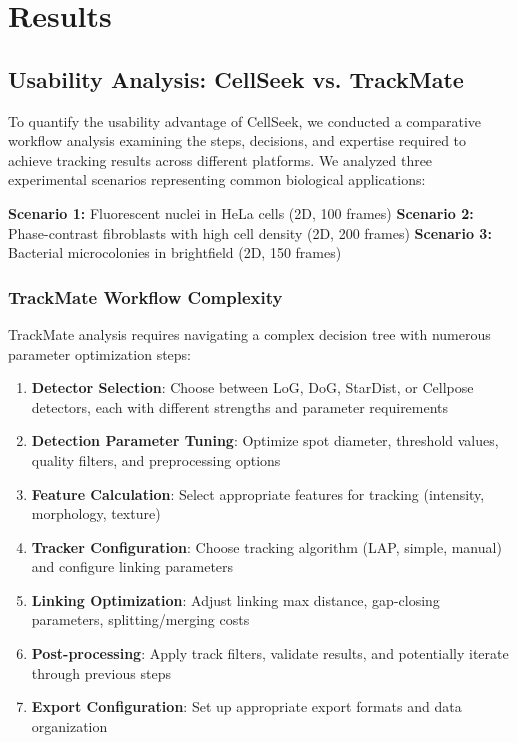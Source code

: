 \documentclass[../cellseek_paper.tex]{subfiles}
\begin{document}
\section{Results}

\subsection{Usability Analysis: CellSeek vs. TrackMate}

To quantify the usability advantage of CellSeek, we conducted a comparative workflow analysis examining the steps, decisions, and expertise required to achieve tracking results across different platforms. We analyzed three experimental scenarios representing common biological applications:

\textbf{Scenario 1:} Fluorescent nuclei in HeLa cells (2D, 100 frames)
\textbf{Scenario 2:} Phase-contrast fibroblasts with high cell density (2D, 200 frames)
\textbf{Scenario 3:} Bacterial microcolonies in brightfield (2D, 150 frames)

\subsubsection{TrackMate Workflow Complexity}

TrackMate analysis requires navigating a complex decision tree with numerous parameter optimization steps:

\begin{enumerate}
  \item \textbf{Detector Selection}: Choose between LoG, DoG, StarDist, or Cellpose detectors, each with different strengths and parameter requirements
  \item \textbf{Detection Parameter Tuning}: Optimize spot diameter, threshold values, quality filters, and preprocessing options
  \item \textbf{Feature Calculation}: Select appropriate features for tracking (intensity, morphology, texture)
  \item \textbf{Tracker Configuration}: Choose tracking algorithm (LAP, simple, manual) and configure linking parameters
  \item \textbf{Linking Optimization}: Adjust linking max distance, gap-closing parameters, splitting/merging costs
  \item \textbf{Post-processing}: Apply track filters, validate results, and potentially iterate through previous steps
  \item \textbf{Export Configuration}: Set up appropriate export formats and data organization
\end{enumerate}
\end{document}
